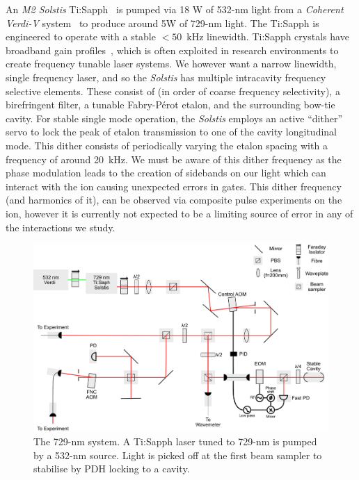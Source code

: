     An \emph{M2 Solstis} Ti:Sapph~\cite{XXX} is pumped via 18 W of 532-nm light
    from a \emph{Coherent Verdi-V} system~\cite{XXX} to produce around 5W of
    729-nm light.  The Ti:Sapph is engineered to operate with a stable $<50$~kHz
    linewidth. Ti:Sapph crystals have broadband gain profiles~\cite{XXX}, which
    is often exploited in research environments to create frequency tunable
    laser systems. We however want a narrow linewidth, single frequency laser,
    and so the \emph{Solstis} has multiple intracavity frequency selective
    elements. These consist of (in order of coarse frequency selectivity), a
    birefringent filter, a tunable Fabry-P\'erot etalon, and the surrounding
    bow-tie cavity. For stable single mode operation, the \emph{Solstis} employs
    an active ``dither'' servo to lock the peak of etalon transmission to one of
    the cavity longitudinal mode. This dither consists of periodically varying
    the etalon spacing with a frequency of around 20~kHz. We must be aware of
    this dither frequency as the phase modulation leads to the creation of
    sidebands on our light which can interact with the ion causing unexpected
    errors in gates. This dither frequency (and harmonics of it), can be observed 
    via composite pulse experiments on the ion, however it is currently not
    expected to be a limiting source of error in any of the interactions
    we study.\\
    \begin{figure}
    \begin{center}
    \noindent\includegraphics[width=0.9\linewidth]{figures/pdf_figure/729_path_small.pdf}
    \end{center}
    \caption{The 729-nm system. A Ti:Sapph laser tuned to 729-nm is
        pumped by a 532-nm source. Light is picked off at the first beam
        sampler to stabilise by PDH locking to a cavity.}
    \label{fig:729}
    \end{figure}
